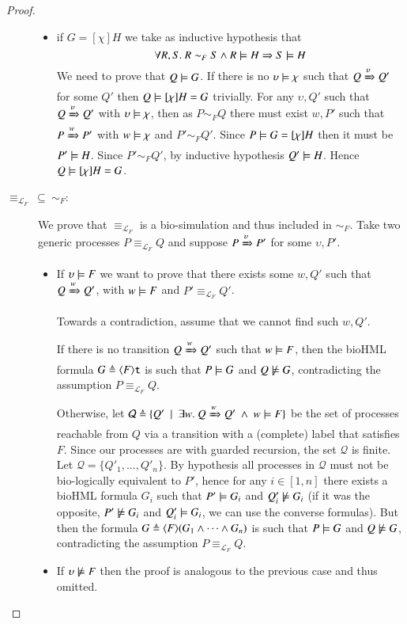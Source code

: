 \begin{proof}
\begin{description}
\begin{itemize}
\item
if $G=[\chi] H$ we take as inductive hypothesis that
$$
\forall R,S.\ R \sim_F S \wedge R\models H \Rightarrow S \models H
$$
We need to prove that $Q\models G$.
If there is no $\upsilon\models \chi$ such that $Q\xRightarrow{\upsilon}Q'$ for some $Q'$ then 
 $Q\models [\chi] H=G$ trivially.
For any $\upsilon,Q'$ such that $Q\xRightarrow{\upsilon}Q'$ with $\upsilon\models \chi$, then as $P\sim_F Q$ there must exist $w,P'$ such that $P\xRightarrow{w}P'$ with $w\models \chi$ and $P'\sim_F Q'$. Since $P\models G=[\chi] H$ then it must be $P'\models H$. Since $P'\sim_F Q'$, by inductive hypothesis $Q'\models H$. Hence $Q\models [\chi] H = G$.
\end{itemize}

\item[$\equiv_{\mathcal{L}_F}\ \subseteq\ \sim_F$:]
We prove that $\equiv_{\mathcal{L}_F}$ is a bio-simulation and thus included in $\sim_F$.
Take two generic processes $P\equiv_{\mathcal{L}_F} Q$ and suppose $P\xRightarrow{\upsilon}P'$ for some $\upsilon,P'$. 
\begin{itemize}
\item
If $\upsilon \models F$ we want to prove that there exists some $w,Q'$ such that $Q\xRightarrow{w}Q'$, with $w\models F$ and $P'\equiv_{\mathcal{L}_F} Q'$.

Towards a contradiction, assume that we cannot find such $w,Q'$.

If there is no transition $Q\xRightarrow{w}Q'$ such that $w\models F$, then the bioHML formula $G \triangleq \langle F\rangle{\tt t}$ is such that $P\models G$ and $Q\not\models G$, contradicting the assumption $P\equiv_{\mathcal{L}_F} Q$.

Otherwise, let $\mathcal{Q}\triangleq \{Q'~\mid~\exists w.\ Q\xRightarrow{w}Q' \ \wedge\ w\models F\}$ be the set of processes reachable from $Q$ via a transition with a (complete) label that satisfies $F$. Since our processes are with guarded recursion, the set $\mathcal{Q}$ is finite. Let $\mathcal{Q} = \{Q'_1,...,Q'_n\}$. By hypothesis all processes in $\mathcal{Q}$ must not be bio-logically equivalent to $P'$, hence for any $i\in[1,n]$ there exists a bioHML formula $G_i$ such that $P'\models G_i$ and $Q'_i\not\models G_i$ (if it was the opposite, $P'\not\models G_i$ and $Q'_i\models G_i$, we can use the converse formulas). But then the formula $G\triangleq \langle F\rangle(G_1\wedge\dots\wedge G_n)$ is such that $P\models G$ and $Q\not\models G$, contradicting the assumption $P\equiv_{\mathcal{L}_F} Q$.

\item
If $\upsilon \not\models F$ then the proof is analogous to the previous case and thus omitted.
\end{itemize}
\end{description}
\end{proof}
